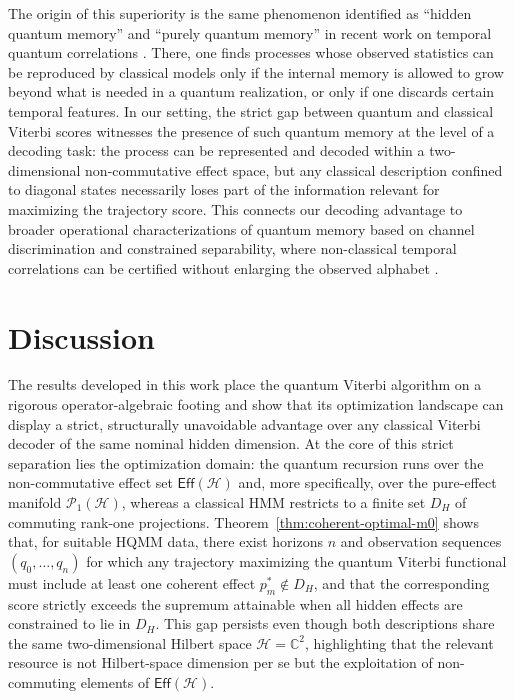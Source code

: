\documentclass[12pt, reco]{article}
\begin{document}
The origin of this superiority is the same phenomenon identified as “hidden quantum memory” and “purely quantum memory” in recent work on temporal quantum correlations \cite{TaElM,TaBra25}. There, one finds processes whose observed statistics can be reproduced by classical models only if the internal memory is allowed to grow beyond what is needed in a quantum realization, or only if one discards certain temporal features. In our setting, the strict gap between quantum and classical Viterbi scores witnesses the presence of such quantum memory at the level of a decoding task: the process can be represented and decoded within a two-dimensional non-commutative effect space, but any classical description confined to diagonal states necessarily loses part of the information relevant for maximizing the trajectory score. This connects our decoding advantage to broader operational characterizations of quantum memory based on channel discrimination and constrained separability, where non-classical temporal correlations can be certified without enlarging the observed alphabet \cite{OZNPQ26}.


\section{Discussion}\label{Sect_disc}
The results developed in this work place the quantum Viterbi algorithm on a rigorous operator-algebraic footing and show that its optimization landscape can display a strict, structurally unavoidable advantage over any classical Viterbi decoder of the same nominal hidden dimension. At the core of this strict separation lies the optimization domain: the quantum recursion runs over the non-commutative effect set \(\mathsf{Eff}(\mathcal{H})\) and, more specifically, over the pure-effect manifold \(\mathcal{P}_1(\mathcal{H})\), whereas a classical HMM restricts to a finite set \(D_H\) of commuting rank-one projections. Theorem~\ref{thm:coherent-optimal-m0} shows that, for suitable HQMM data, there exist horizons \(n\) and observation sequences \((q_0,\dots,q_n)\) for which any trajectory maximizing the quantum Viterbi functional must include at least one coherent effect \(p_m^*\notin D_H\), and that the corresponding score strictly exceeds the supremum attainable when all hidden effects are constrained to lie in \(D_H\). This gap persists even though both descriptions share the same two-dimensional Hilbert space \(\mathcal{H}=\mathbb{C}^2\), highlighting that the relevant resource is not Hilbert-space dimension per se but the exploitation of non-commuting elements of \(\mathsf{Eff}(\mathcal{H})\).
\end{document}

